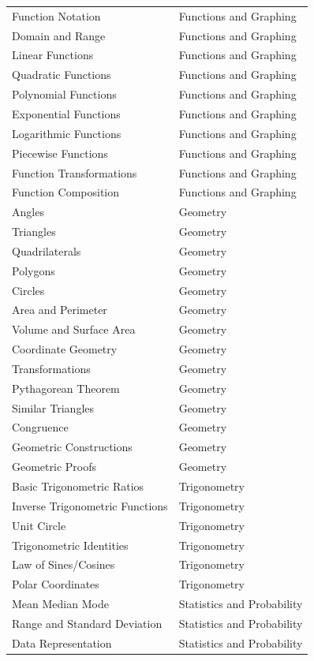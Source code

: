 \documentclass[
    a4paper, %
    10pt, %
    twoside, %
]{LTJournalArticle}
\begin{document}
\begin{supertabular}{p{0.45\columnwidth}p{0.45\columnwidth}}
Function Notation & Functions and Graphing \\
Domain and Range & Functions and Graphing \\
Linear Functions & Functions and Graphing \\
Quadratic Functions & Functions and Graphing \\
Polynomial Functions & Functions and Graphing \\
Exponential Functions & Functions and Graphing \\
Logarithmic Functions & Functions and Graphing \\
Piecewise Functions & Functions and Graphing \\
Function Transformations & Functions and Graphing \\
Function Composition & Functions and Graphing \\
Angles & Geometry \\
Triangles & Geometry \\
Quadrilaterals & Geometry \\
Polygons & Geometry \\
Circles & Geometry \\
Area and Perimeter & Geometry \\
Volume and Surface Area & Geometry \\
Coordinate Geometry & Geometry \\
Transformations & Geometry \\
Pythagorean Theorem & Geometry \\
Similar Triangles & Geometry \\
Congruence & Geometry \\
Geometric Constructions & Geometry \\
Geometric Proofs & Geometry \\
Basic Trigonometric Ratios & Trigonometry \\
Inverse Trigonometric Functions & Trigonometry \\
Unit Circle & Trigonometry \\
Trigonometric Identities & Trigonometry \\
Law of Sines/Cosines & Trigonometry \\
Polar Coordinates & Trigonometry \\
Mean Median Mode & Statistics and Probability \\
Range and Standard Deviation & Statistics and Probability \\
Data Representation & Statistics and Probability \\

\end{supertabular}
\end{document}
